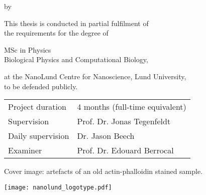 {
\pagestyle{empty}


\begin{titlepage}
	
	\frutigerfont
	
	\begin{center}

		
		{\Huge \garamondfont \thetitle}
		
		\smallskip
		by
		\bigskip
		
		{\Large \garamondfont \theauthor}
		
		\bigskip
		\bigskip
		
		This thesis is conducted in partial fulfilment of \\
		the requirements for the degree of 
		
		\bigskip
		
		{MSc in Physics} \\
		Biological Physics and Computational Biology,
		
		\bigskip
		
		at the NanoLund Centre for Nanoscience, Lund University,\\
		to be defended publicly.
		
		
		\vspace{5cm}
		
		\vfill
		\begin{tabular}{ll}
			Project duration & 4 months (full-time equivalent)\\
			Supervision & Prof. Dr. Jonas Tegenfeldt\\
			Daily supervision & Dr. Jason Beech\\
			Examiner & Prof. Dr. Edouard Berrocal
		\end{tabular}
	
		\bigskip
	
		Cover image: artefacts of an old actin-phalloidin stained sample.
	
		\vspace{2cm}
		
		\texttt{[image: nanolund\_logotype.pdf]}
	
	
	\end{center}
\end{titlepage}

%
%
%
%
%
%
%
%

}